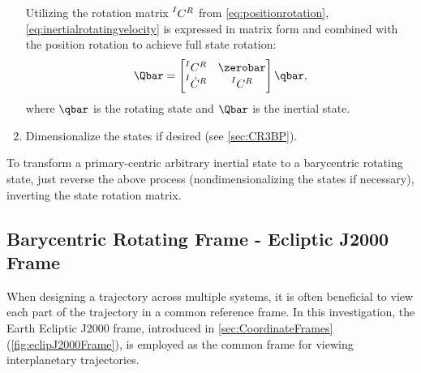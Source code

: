 \begin{enumerate}
\begin{equation}
                \label{eq:inertialrotatingvelocity}
            \end{equation}
            Utilizing the rotation matrix $\prescript{I}{}{C}^{R}$ from \cref{eq:positionrotation},
            \cref{eq:inertialrotatingvelocity} is expressed in matrix form and combined with the
            position rotation to achieve full state rotation:
            \begin{equation}
                \Qbar=\begin{bmatrix}   \prescript{I}{}{C}^{R}      &   \zerobar                \\
                                        \prescript{I}{}{\dot{C}}^{R} &   \prescript{I}{}{C}^{R}  \end{bmatrix}\qbar,
                \label{eq:rotation}
            \end{equation}
            where $\qbar$ is the rotating state and $\Qbar$ is the inertial state.
    \item   Dimensionalize the states if desired (see \cref{sec:CR3BP}).
\end{enumerate}
To transform a primary-centric arbitrary inertial state to a barycentric rotating state, just
reverse the above process (nondimensionalizing the states if necessary), inverting the state
rotation matrix.

\subsection{Barycentric Rotating Frame - Ecliptic J2000 Frame}
When designing a trajectory across multiple systems, it is often beneficial to view each part of
the trajectory in a common reference frame. In this investigation, the Earth Ecliptic J2000 frame,
introduced in \cref{sec:CoordinateFrames} (\cref{fig:eclipJ2000Frame}), is employed as the common
frame for viewing interplanetary trajectories.

